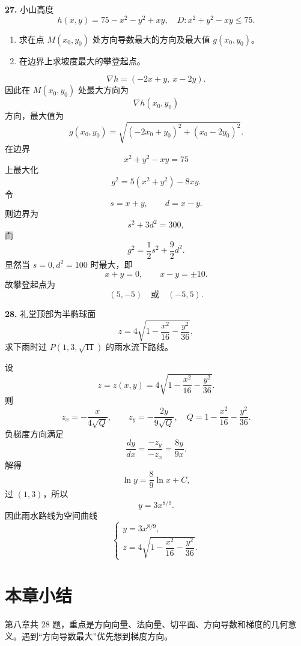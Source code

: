 \begin{problemblock}
\textbf{27.} 小山高度
\[
h(x,y)=75-x^2-y^2+xy,\quad D:x^2+y^2-xy\le75.
\]
\begin{enumerate}
\item 求在点 \(M(x_0,y_0)\) 处方向导数最大的方向及最大值 \(g(x_0,y_0)\)。
\item 在边界上求坡度最大的攀登起点。
\end{enumerate}
\end{problemblock}
\begin{solutionblock}
\[
\nabla h=(-2x+y,\ x-2y).
\]
因此在 \(M(x_0,y_0)\) 处最大方向为
\[
\boxed{\nabla h(x_0,y_0)}
\]
方向，最大值为
\[
\boxed{g(x_0,y_0)=\sqrt{(-2x_0+y_0)^2+(x_0-2y_0)^2}}.
\]
在边界
\[
x^2+y^2-xy=75
\]
上最大化
\[
g^2=5(x^2+y^2)-8xy.
\]
令
\[
s=x+y,\qquad d=x-y.
\]
则边界为
\[
s^2+3d^2=300,
\]
而
\[
g^2=\frac12s^2+\frac92d^2.
\]
显然当 \(s=0,d^2=100\) 时最大，即
\[
x+y=0,\qquad x-y=\pm10.
\]
故攀登起点为
\[
\boxed{(5,-5)\quad\text{或}\quad(-5,5)}.
\]
\end{solutionblock}

\begin{problemblock}
\textbf{28.} 礼堂顶部为半椭球面
\[
z=4\sqrt{1-\frac{x^2}{16}-\frac{y^2}{36}},
\]
求下雨时过 \(P(1,3,\sqrt{11})\) 的雨水流下路线。
\end{problemblock}
\begin{solutionblock}
设
\[
z=z(x,y)=4\sqrt{1-\frac{x^2}{16}-\frac{y^2}{36}}.
\]
则
\[
z_x=-\frac{x}{4\sqrt Q},\qquad z_y=-\frac{2y}{9\sqrt Q},
\quad Q=1-\frac{x^2}{16}-\frac{y^2}{36}.
\]
负梯度方向满足
\[
\frac{dy}{dx}=\frac{-z_y}{-z_x}=\frac{8y}{9x}.
\]
解得
\[
\ln y=\frac89\ln x+C,
\]
过 \((1,3)\)，所以
\[
y=3x^{8/9}.
\]
因此雨水路线为空间曲线
\[
\boxed{
\begin{cases}
y=3x^{8/9},\\
z=4\sqrt{1-\dfrac{x^2}{16}-\dfrac{y^2}{36}}.
\end{cases}}
\]
\end{solutionblock}

\section{本章小结}
第八章共 \(28\) 题，重点是方向向量、法向量、切平面、方向导数和梯度的几何意义。遇到“方向导数最大”优先想到梯度方向。
